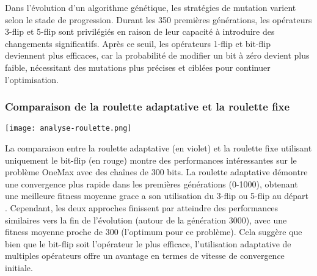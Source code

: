 \documentclass{article}
\begin{document}
Dans l'évolution d'un algorithme génétique, les stratégies de mutation varient selon le stade de progression. Durant les 350 premières générations, les opérateurs 3-flip et 5-flip sont privilégiés en raison de leur capacité à introduire des changements significatifs. Après ce seuil, les opérateurs 1-flip et bit-flip deviennent plus efficaces, car la probabilité de modifier un bit à zéro devient plus faible, nécessitant des mutations plus précises et ciblées pour continuer l'optimisation.

\subsubsection{Comparaison de la roulette adaptative et la roulette fixe}
\texttt{[image: analyse-roulette.png]}

La comparaison entre la roulette adaptative (en violet) et la roulette fixe utilisant uniquement le bit-flip (en rouge) montre des performances intéressantes sur le problème OneMax avec des chaînes de 300 bits. La roulette adaptative démontre une convergence plus rapide dans les premières générations (0-1000), obtenant une meilleure fitness moyenne grace a son utilisation du 3-flip ou 5-flip au départ . Cependant, les deux approches finissent par atteindre des performances similaires vers la fin de l'évolution (autour de la génération 3000), avec une fitness moyenne proche de 300 (l'optimum pour ce problème). Cela suggère que bien que le bit-flip soit l'opérateur le plus efficace, l'utilisation adaptative de multiples opérateurs offre un avantage en termes de vitesse de convergence initiale.


\end{document}
